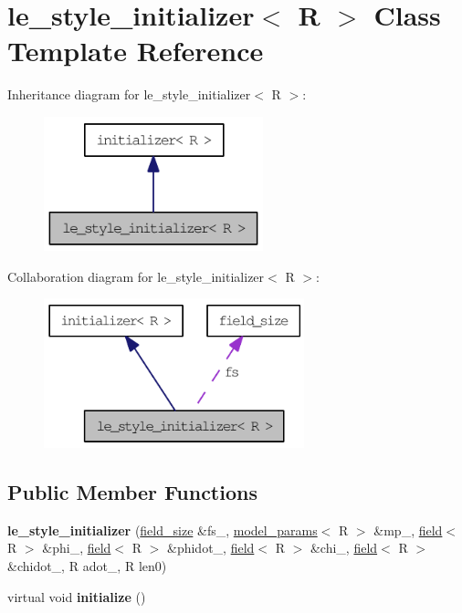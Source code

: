 \hypertarget{classle__style__initializer}{
\section{le\_\-style\_\-initializer$<$ R $>$ Class Template Reference}
\label{classle__style__initializer}
}
Inheritance diagram for le\_\-style\_\-initializer$<$ R $>$:\nopagebreak
\begin{figure}[H]
\begin{center}
\leavevmode
\includegraphics[width=180pt]{classle__style__initializer__inherit__graph}
\end{center}
\end{figure}
Collaboration diagram for le\_\-style\_\-initializer$<$ R $>$:\nopagebreak
\begin{figure}[H]
\begin{center}
\leavevmode
\includegraphics[width=214pt]{classle__style__initializer__coll__graph}
\end{center}
\end{figure}
\subsection*{Public Member Functions}
\begin{DoxyCompactItemize}
\item 
\hypertarget{classle__style__initializer_a7a21af6b2b39ec0800c7336b8fa47ece}{
{\bfseries le\_\-style\_\-initializer} (\hyperlink{structfield__size}{field\_\-size} \&fs\_\-, \hyperlink{structmodel__params}{model\_\-params}$<$ R $>$ \&mp\_\-, \hyperlink{classfield}{field}$<$ R $>$ \&phi\_\-, \hyperlink{classfield}{field}$<$ R $>$ \&phidot\_\-, \hyperlink{classfield}{field}$<$ R $>$ \&chi\_\-, \hyperlink{classfield}{field}$<$ R $>$ \&chidot\_\-, R adot\_\-, R len0)}
\label{classle__style__initializer_a7a21af6b2b39ec0800c7336b8fa47ece}

\item 
\hypertarget{classle__style__initializer_ac5ca8b27383d7b35170f6d5bf6e3d96f}{
virtual void {\bfseries initialize} ()}
\label{classle__style__initializer_ac5ca8b27383d7b35170f6d5bf6e3d96f}

\end{DoxyCompactItemize}
